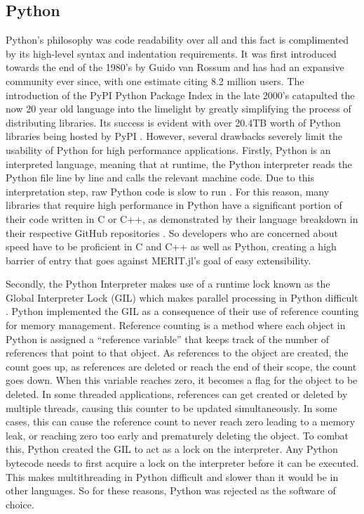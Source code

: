 \subsection{Python}
Python's philosophy was code readability over all and this fact is complimented by its high-level syntax and indentation
requirements. It was first introduced towards the end of the 1980's by Guido van Rossum and has had an expansive
community ever since, with one estimate citing 8.2 million users. The introduction of the PyPI Python Package Index in
the late 2000's catapulted the now 20 year old language into the limelight by greatly simplifying the process of
distributing libraries. Its success is evident with over 20.4TB worth of Python libraries being hosted by PyPI
\cite{indexPyPIStatistics}. However, several drawbacks severely limit the usability of Python for high performance
applications. Firstly, Python is an interpreted language, meaning that at runtime, the Python interpreter reads the
Python file line by line and calls the relevant machine code. Due to this interpretation step, raw Python code is slow
to run \cite{baranyPythonInterpreterPerformance2014}. For this reason, many libraries that require high performance in
Python have a significant portion of their code written in C or C++, as demonstrated by their language breakdown in
their respective GitHub repositories \cite{Tensorflow, paszkePyTorch}. So developers who are concerned about speed have
to be proficient in C and C++ as well as Python, creating a high barrier of entry that goes against MERIT.jl's goal of
easy extensibility.

Secondly, the Python Interpreter makes use of a runtime lock known as the Global Interpreter Lock (GIL) which makes
parallel processing in Python difficult \cite{ajitsariaWhatPythonGlobal}. Python implemented the GIL as a consequence of
their use of reference counting for memory management. Reference counting is a method where each object in Python is
assigned a ``reference variable'' that keeps track of the number of references that point to that object. As references to
the object are created, the count goes up, as references are deleted or reach the end of their scope, the count goes
down. When this variable reaches zero, it becomes a flag for the object to be deleted. In some threaded applications,
references can get created or deleted by multiple threads, causing this counter to be updated simultaneously. In some
cases, this can cause the reference count to never reach zero leading to a memory leak, or reaching zero too early and
prematurely deleting the object. To combat this, Python created the GIL to act as a lock on the interpreter. Any Python
bytecode needs to first acquire a lock on the interpreter before it can be executed. This makes multithreading in Python
difficult and slower than it would be in other languages. So for these reasons, Python was rejected as the software of
choice.

